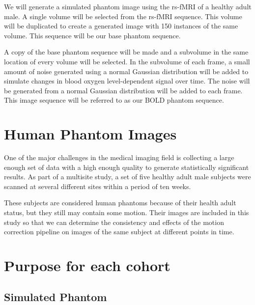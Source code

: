 We will generate a simulated phantom image using the rs-fMRI of a healthy adult male. A single volume will be selected from the rs-fMRI sequence. This volume will be duplicated to create a generated image with 150 instances of the same volume. This sequence will be our base phantom sequence. 

A copy of the base phantom sequence will be made and a subvolume in the same location of every volume will be selected. In the subvolume of each frame, a small amount of noise generated using a normal Gaussian distribution will be added to simulate changes in blood oxygen level-dependent signal over time. The noise will be generated from a normal Gaussian distribution will be added to each frame. This image sequence will be referred to as our BOLD phantom sequence.

\section{Human Phantom Images}

One of the major challenges in the medical imaging field is collecting a large enough set of data with a high enough quality to generate statistically significant results. As part of a multisite study, a set of five healthy adult male subjects were scanned at several different sites within a period of ten weeks.

These subjects are considered human phantoms because of their health adult status, but they still may contain some motion. Their images are included in this study so that we can determine the consistency and effects of the motion correction pipeline on images of the same subject at different points in time.


\section{Purpose for each cohort}

\subsection{Simulated Phantom}

